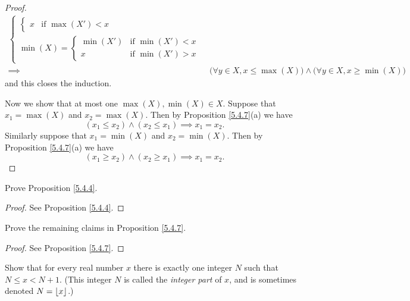 \begin{proof}
\begin{align*}
\begin{cases}
\begin{cases}
                          x        & \text{if } \max(X') < x
                      \end{cases} \\
                       \min(X) = \begin{cases}
                          \min(X') & \text{if } \min(X') < x \\
                          x        & \text{if } \min(X') > x
                      \end{cases}
                   \end{cases}                                                                                                \\
        \implies & \big(\forall y \in X, x \leq \max(X)\big) \land \big(\forall y \in X, x \geq \min(X)\big)
    \end{align*}
    and this closes the induction.

    Now we show that at most one \(\max(X), \min(X) \in X\).
    Suppose that \(x_1 = \max(X)\) and \(x_2 = \max(X)\).
    Then by Proposition \ref{5.4.7}(a) we have
    \[
        (x_1 \leq x_2) \land (x_2 \leq x_1) \implies x_1 = x_2.
    \]
    Similarly suppose that \(x_1 = \min(X)\) and \(x_2 = \min(X)\).
    Then by Proposition \ref{5.4.7}(a) we have
    \[
        (x_1 \geq x_2) \land (x_2 \geq x_1) \implies x_1 = x_2.
    \]
\end{proof}

\exercisesection

\begin{exercise}\label{ex 5.4.1}
    Prove Proposition \ref{5.4.4}.
\end{exercise}

\begin{proof}
    See Proposition \ref{5.4.4}.
\end{proof}

\begin{exercise}\label{ex 5.4.2}
    Prove the remaining claims in Proposition \ref{5.4.7}.
\end{exercise}

\begin{proof}
    See Proposition \ref{5.4.7}.
\end{proof}

\begin{exercise}\label{ex 5.4.3}
    Show that for every real number \(x\) there is exactly one integer \(N\) such that \(N \leq x < N + 1\).
    (This integer \(N\) is called the \emph{integer part} of \(x\), and is sometimes denoted \(N = \floor*{x}\).)
\end{exercise}

